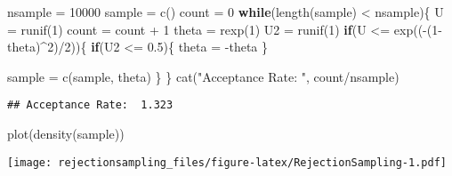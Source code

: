 \documentclass[
]{article}
\newenvironment{Shaded}{\begin{snugshade}}{\end{snugshade}}
\newcommand{\ControlFlowTok}[1]{\textcolor[rgb]{0.13,0.29,0.53}{\textbf{#1}}}
\newcommand{\DecValTok}[1]{\textcolor[rgb]{0.00,0.00,0.81}{#1}}
\newcommand{\FloatTok}[1]{\textcolor[rgb]{0.00,0.00,0.81}{#1}}
\newcommand{\FunctionTok}[1]{\textcolor[rgb]{0.00,0.00,0.00}{#1}}
\newcommand{\NormalTok}[1]{#1}
\newcommand{\OtherTok}[1]{\textcolor[rgb]{0.56,0.35,0.01}{#1}}
\newcommand{\SpecialCharTok}[1]{\textcolor[rgb]{0.00,0.00,0.00}{#1}}
\newcommand{\StringTok}[1]{\textcolor[rgb]{0.31,0.60,0.02}{#1}}
\begin{document}
\begin{Shaded}
\begin{Highlighting}[]
\NormalTok{nsample }\OtherTok{=} \DecValTok{10000}
\NormalTok{sample }\OtherTok{=} \FunctionTok{c}\NormalTok{()}
\NormalTok{count }\OtherTok{=} \DecValTok{0}
\ControlFlowTok{while}\NormalTok{(}\FunctionTok{length}\NormalTok{(sample) }\SpecialCharTok{\textless{}}\NormalTok{ nsample)\{}
\NormalTok{  U }\OtherTok{=} \FunctionTok{runif}\NormalTok{(}\DecValTok{1}\NormalTok{)}
\NormalTok{  count }\OtherTok{=}\NormalTok{ count }\SpecialCharTok{+} \DecValTok{1}
\NormalTok{  theta }\OtherTok{=} \FunctionTok{rexp}\NormalTok{(}\DecValTok{1}\NormalTok{)}
\NormalTok{  U2 }\OtherTok{=} \FunctionTok{runif}\NormalTok{(}\DecValTok{1}\NormalTok{)}
  \ControlFlowTok{if}\NormalTok{(U }\SpecialCharTok{\textless{}=} \FunctionTok{exp}\NormalTok{((}\SpecialCharTok{{-}}\NormalTok{(}\DecValTok{1}\SpecialCharTok{{-}}\NormalTok{theta)}\SpecialCharTok{\^{}}\DecValTok{2}\NormalTok{)}\SpecialCharTok{/}\DecValTok{2}\NormalTok{))\{ }
    \ControlFlowTok{if}\NormalTok{(U2 }\SpecialCharTok{\textless{}=} \FloatTok{0.5}\NormalTok{)\{}
\NormalTok{      theta }\OtherTok{=} \SpecialCharTok{{-}}\NormalTok{theta}
\NormalTok{    \}}
    
\NormalTok{    sample }\OtherTok{=} \FunctionTok{c}\NormalTok{(sample, theta)}
\NormalTok{  \}}
\NormalTok{\}}
\FunctionTok{cat}\NormalTok{(}\StringTok{"Acceptance Rate: "}\NormalTok{, count}\SpecialCharTok{/}\NormalTok{nsample)}
\end{Highlighting}
\end{Shaded}

\begin{verbatim}
## Acceptance Rate:  1.323
\end{verbatim}

\begin{Shaded}
\begin{Highlighting}[]
\FunctionTok{plot}\NormalTok{(}\FunctionTok{density}\NormalTok{(sample))}
\end{Highlighting}
\end{Shaded}

\texttt{[image: rejectionsampling\_files/figure-latex/RejectionSampling-1.pdf]}
\end{document}

